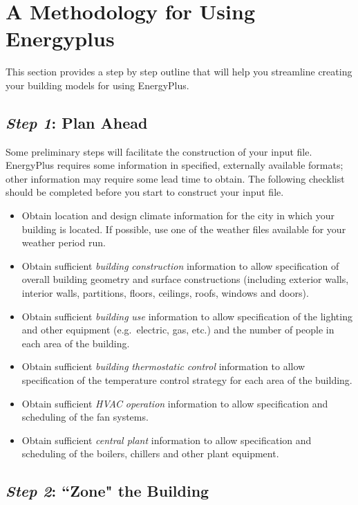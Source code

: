 \section{A Methodology for Using Energyplus}\label{a-methodology-for-using-energyplus}

This section provides a step by step outline that will help you streamline creating your building models for using EnergyPlus.

\subsection{\emph{Step 1}: Plan Ahead}\label{step-1-plan-ahead}

Some preliminary steps will facilitate the construction of your input file. EnergyPlus requires some information in specified, externally available formats; other information may require some lead time to obtain. The following checklist should be completed before you start to construct your input file.

\begin{itemize}
\item
  Obtain location and design climate information for the city in which your building is located. If possible, use one of the weather files available for your weather period run.
\item
  Obtain sufficient \emph{building} \emph{construction} information to allow specification of overall building geometry and surface constructions (including exterior walls, interior walls, partitions, floors, ceilings, roofs, windows and doors).
\item
  Obtain sufficient \emph{building} \emph{use} information to allow specification of the lighting and other equipment (e.g.~electric, gas, etc.) and the number of people in each area of the building.
\item
  Obtain sufficient \emph{building} \emph{thermostatic} \emph{control} information to allow specification of the temperature control strategy for each area of the building.
\item
  Obtain sufficient \emph{HVAC} \emph{operation} information to allow specification and scheduling of the fan systems.
\item
  Obtain sufficient \emph{central plant} information to allow specification and scheduling of the boilers, chillers and other plant equipment.
\end{itemize}

\subsection{\emph{Step 2}: ``Zone" the Building}\label{step-2-zone-the-building}

